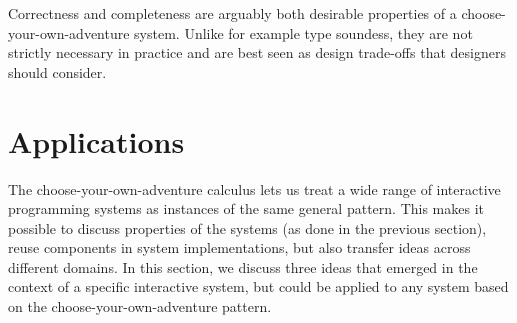 \documentclass[a4paper,UKenglish,cleveref, autoref, thm-restate]{lipics-v2021}
\begin{document}
Correctness and completeness are arguably both desirable properties of a choose-your-own-adventure
system. Unlike for example type soundess, they are not strictly necessary in practice and are best
seen as design trade-offs that designers should consider.

\section{Applications}
\label{sec:applications}

The choose-your-own-adventure calculus lets us treat a wide range of interactive programming
systems as instances of the same general pattern. This makes it possible to discuss properties
of the systems (as done in the previous section), reuse components in system implementations,
but also transfer ideas across different domains. In this section, we discuss three ideas that
emerged in the context of a specific interactive system, but could be applied to any system
based on the choose-your-own-adventure pattern.

~
\end{document}
